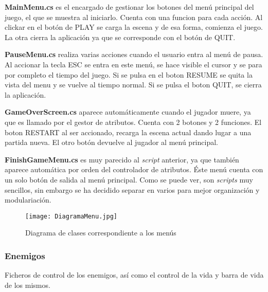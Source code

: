 \textbf{MainMenu.cs} es el encargado de gestionar los botones del menú principal del juego, el que se muestra al iniciarlo. Cuenta con una funcion para cada acción. Al clickar en el botón de PLAY se carga la escena y de esa forma, comienza el juego. La otra cierra la aplicación ya que se corresponde con el botón de QUIT.

\textbf{PauseMenu.cs} realiza varias acciones cuando el usuario entra al menú de pausa. Al accionar la tecla ESC se entra en este menú, se hace visible el cursor y se para por completo el tiempo del juego. Si se pulsa en el boton RESUME se quita la vista del menu y se vuelve al tiempo normal. Si se pulsa el boton QUIT, se cierra la aplicación.

\textbf{GameOverScreen.cs} aparece automáticamente cuando el jugador muere, ya que es llamado por el gestor de atributos. Cuenta con 2 botones y 2 funciones. El boton RESTART al ser accionado, recarga la escena actual dando lugar a una partida nueva. El otro botón devuelve al jugador al menú principal. 

\textbf{FinishGameMenu.cs} es muy parecido al \textit{script} anterior, ya que también aparece automática por orden del controlador de atributos. Éste menú cuenta con un solo botón de salida al menú principal. Como se puede ver, son \textit{scripts} muy sencillos, sin embargo se ha decidido separar en varios para mejor organización y modulariación.

\begin{figure}[H]
    \centering
    \texttt{[image: DiagramaMenu.jpg]}
    \caption{Diagrama de clases correspondiente a los menús}
\end{figure}

\subsubsection{Enemigos}

Ficheros de control de los enemigos, así como el control de la vida y barra de vida de los mismos.

